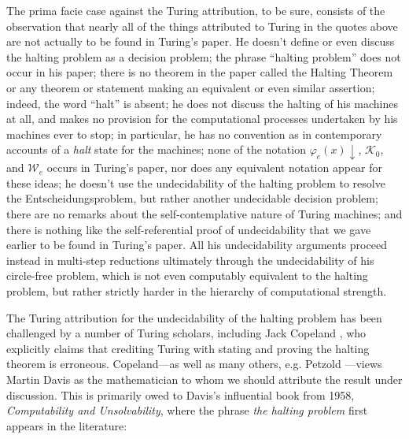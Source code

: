 \documentclass[12pt]{amsart}
\begin{document}
The prima facie case against the Turing attribution, to be sure, consists of the observation that nearly all of the things attributed to Turing in the quotes above are not actually to be found in Turing's paper. He doesn't define or even discuss the halting problem as a decision problem; the phrase ``halting problem'' does not occur in his paper; there is no theorem in the paper called the Halting Theorem or any theorem or statement making an equivalent or even similar assertion; indeed, the word ``halt'' is absent; he does not discuss the halting of his machines at all, and makes no provision for the computational processes undertaken by his machines ever to stop; in particular, he has no convention as in contemporary accounts of a \emph{halt} state for the machines; none of the notation $\varphi_e(x){\downarrow}$, $\mathcal{K}_0$, and $\mathcal{W}_e$ occurs in Turing's paper, nor does any equivalent notation appear for these ideas; he doesn't use the undecidability of the halting problem to resolve the Entscheidungsproblem, but rather another undecidable decision problem; there are no remarks about the self-contemplative nature of Turing machines; and there is nothing like the self-referential proof of undecidability that we gave earlier to be found in Turing's paper. All his undecidability arguments proceed instead in multi-step reductions ultimately through the undecidability of his circle-free problem, which is not even computably equivalent to the halting problem, but rather strictly harder in the hierarchy of computational strength.

The Turing attribution for the undecidability of the halting problem has been challenged by a number of Turing scholars, including Jack Copeland \cite[p. 40]{copeland2004essential}, who explicitly claims that crediting Turing with stating and proving the halting theorem is erroneous. Copeland---as well as many others, e.g. Petzold \cite[p. 179]{petzold2008annotated}---views Martin Davis as the mathematician to whom we should attribute the result under discussion. This is primarily owed to Davis's influential book from 1958, \textit{Computability and Unsolvability}, where the phrase \textit{the halting problem} first appears in the literature:
\end{document}
